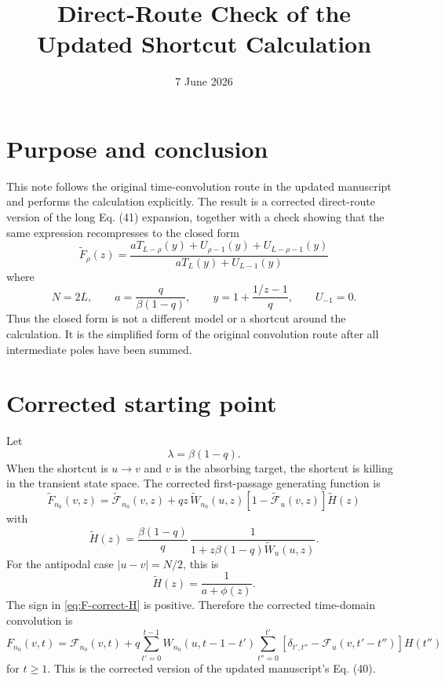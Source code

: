 \documentclass[11pt]{article}
\title{Direct-Route Check of the Updated Shortcut Calculation}
\author{}
\date{7 June 2026}
\newcommand{\wt}{\widetilde}
\newcommand{\Fcal}{\mathcal{F}}
\begin{document}
\maketitle

\section*{Purpose and conclusion}

This note follows the original time-convolution route in the updated
manuscript and performs the calculation explicitly.  The result is a corrected
direct-route version of the long Eq. (41) expansion, together with a check showing
that the same expression recompresses to the closed form
\begin{equation}
  \boxed{
  \wt F_\rho(z)=
  \frac{aT_{L-\rho}(y)+U_{\rho-1}(y)+U_{L-\rho-1}(y)}
  {aT_L(y)+U_{L-1}(y)}}
  \label{eq:main-closed}
\end{equation}
where
\[
  N=2L,\qquad
  a=\frac{q}{\beta(1-q)},\qquad
  y=1+\frac{1/z-1}{q},\qquad U_{-1}=0.
\]
Thus the closed form is not a different model or a shortcut around the
calculation.  It is the simplified form of the original convolution route after
all intermediate poles have been summed.

\section{Corrected starting point}

Let
\[
  \lambda=\beta(1-q).
\]
When the shortcut is \(u\to v\) and \(v\) is the absorbing target, the shortcut
is killing in the transient state space.  The corrected first-passage
generating function is
\begin{equation}
  \boxed{
  \wt F_{n_0}(v,z)=
  \wt{\Fcal}_{n_0}(v,z)
  +qz\,\wt W_{n_0}(u,z)
  \left[1-\wt{\Fcal}_{u}(v,z)\right]\wt H(z)}
  \label{eq:F-correct-H}
\end{equation}
with
\begin{equation}
  \wt H(z)=
  \frac{\beta(1-q)}{q}\,
  \frac{1}{1+z\beta(1-q)\wt W_u(u,z)}.
  \label{eq:H-def}
\end{equation}
For the antipodal case \(|u-v|=N/2\), this is
\begin{equation}
  \wt H(z)=\frac{1}{a+\phi(z)}.
  \label{eq:H-a-phi}
\end{equation}
The sign in \eqref{eq:F-correct-H} is positive.  Therefore the corrected
time-domain convolution is
\begin{equation}
  \boxed{
  F_{n_0}(v,t)=\Fcal_{n_0}(v,t)
  +q\sum_{t'=0}^{t-1}W_{n_0}(u,t-1-t')
  \sum_{t''=0}^{t'}
  \left[\delta_{t',t''}-\Fcal_u(v,t'-t'')\right]H(t'')}
  \label{eq:time-convolution}
\end{equation}
for \(t\ge1\).  This is the corrected version of the updated manuscript's
Eq. (40).
\end{document}
